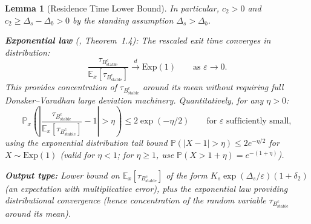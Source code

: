 \documentclass[11pt]{article}
\newtheorem{lemma}{Lemma}
\newcommand{\eps}{\varepsilon}
\newcommand{\Ds}{\Delta_s}
\newcommand{\Db}{\Delta_b}
\newcommand{\Bstable}{B_{\mathrm{stable}}}
\begin{document}
\begin{lemma}[Residence Time Lower Bound]
In particular, $c_2 > 0$ and $c_2 \geq \Ds - \Db > 0$ by the
standing assumption $\Ds > \Db$.

\medskip
\textbf{Exponential law} (\cite{BEGK02}, Theorem~1.4):
The rescaled exit time converges in distribution:
\begin{equation}\label{eq:exp-law}
  \frac{\tau_{\Bstable^c}}{\mathbb{E}_x[\tau_{\Bstable^c}]}
  \xrightarrow{d} \mathrm{Exp}(1)
  \qquad \text{as } \eps \to 0.
\end{equation}
This provides concentration of $\tau_{\Bstable^c}$ around its mean
without requiring full Donsker--Varadhan large deviation machinery.
Quantitatively, for any $\eta > 0$:
\begin{equation}\label{eq:exp-concentration}
  \mathbb{P}_x\!\left(
    \left|\frac{\tau_{\Bstable^c}}
              {\mathbb{E}_x[\tau_{\Bstable^c}]} - 1\right|
    > \eta
  \right)
  \leq 2\exp(-\eta/2)
  \qquad \text{for } \eps \text{ sufficiently small},
\end{equation}
using the exponential distribution tail bound
$\mathbb{P}(|X - 1| > \eta) \leq 2e^{-\eta/2}$ for $X \sim \mathrm{Exp}(1)$
(valid for $\eta < 1$; for $\eta \geq 1$, use $\mathbb{P}(X > 1+\eta)
= e^{-(1+\eta)}$).

\medskip
\textbf{Output type:}
Lower bound on $\mathbb{E}_x[\tau_{\Bstable^c}]$ of the form
$K_s \exp(\Ds/\eps)(1 + \delta_2)$ (an expectation with multiplicative
error), plus the exponential law providing distributional convergence
(hence concentration of the random variable $\tau_{\Bstable^c}$
around its mean).
\end{lemma}
\end{document}
